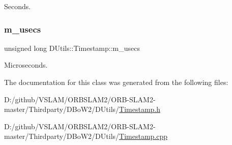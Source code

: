 Seconds. 

\mbox{\label{class_d_utils_1_1_timestamp_afb8947a2cf3b04919f782f4490ca0935}} 
\subsubsection{\texorpdfstring{m\+\_\+usecs}{m\_usecs}}
{\footnotesize\ttfamily unsigned long D\+Utils\+::\+Timestamp\+::m\+\_\+usecs\hspace{0.3cm}{\ttfamily [protected]}}



Microseconds. 



The documentation for this class was generated from the following files\+:\begin{DoxyCompactItemize}
\item 
D\+:/github/\+V\+S\+L\+A\+M/\+O\+R\+B\+S\+L\+A\+M2/\+O\+R\+B-\/\+S\+L\+A\+M2-\/master/\+Thirdparty/\+D\+Bo\+W2/\+D\+Utils/\mbox{\hyperlink{_timestamp_8h}{Timestamp.\+h}}\item 
D\+:/github/\+V\+S\+L\+A\+M/\+O\+R\+B\+S\+L\+A\+M2/\+O\+R\+B-\/\+S\+L\+A\+M2-\/master/\+Thirdparty/\+D\+Bo\+W2/\+D\+Utils/\mbox{\hyperlink{_timestamp_8cpp}{Timestamp.\+cpp}}\end{DoxyCompactItemize}
